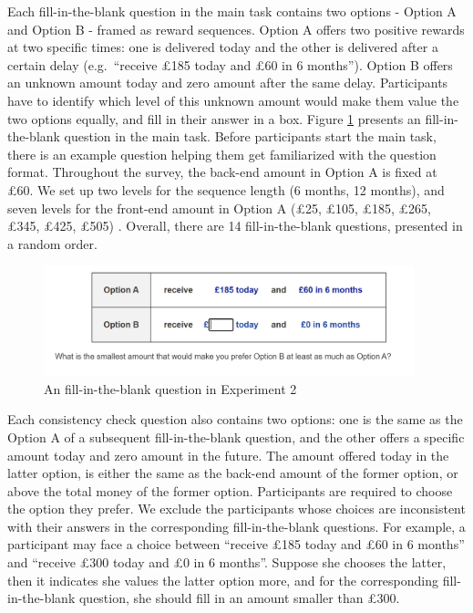\documentclass[
  12pt,
]{article}
\begin{document}
Each fill-in-the-blank question in the main task contains two options -
Option A and Option B - framed as reward sequences. Option A offers two
positive rewards at two specific times: one is delivered today and the
other is delivered after a certain delay (e.g.~``receive £185 today and
£60 in 6 months''). Option B offers an unknown amount today and zero
amount after the same delay. Participants have to identify which level
of this unknown amount would make them value the two options equally,
and fill in their answer in a box. Figure \ref{fig:exp2_screenshot}
presents an fill-in-the-blank question in the main task. Before
participants start the main task, there is an example question helping
them get familiarized with the question format. Throughout the survey,
the back-end amount in Option A is fixed at £60. We set up two levels
for the sequence length (6 months, 12 months), and seven levels for the
front-end amount in Option A (£25, £105, £185, £265, £345, £425, £505) .
Overall, there are 14 fill-in-the-blank questions, presented in a random
order.

\begin{figure}   
  \vspace{16pt}   
  \centering   
  \includegraphics[width=0.96\textwidth]{figures/exp2_screenshot.png}    
  \caption{An fill-in-the-blank question in Experiment 2}   
  \label{fig:exp2_screenshot} 
\end{figure}

Each consistency check question also contains two options: one is the
same as the Option A of a subsequent fill-in-the-blank question, and the
other offers a specific amount today and zero amount in the future. The
amount offered today in the latter option, is either the same as the
back-end amount of the former option, or above the total money of the
former option. Participants are required to choose the option they
prefer. We exclude the participants whose choices are inconsistent with
their answers in the corresponding fill-in-the-blank questions. For
example, a participant may face a choice between ``receive £185 today
and £60 in 6 months'' and ``receive £300 today and £0 in 6 months''.
Suppose she chooses the latter, then it indicates she values the latter
option more, and for the corresponding fill-in-the-blank question, she
should fill in an amount smaller than £300.
\end{document}
